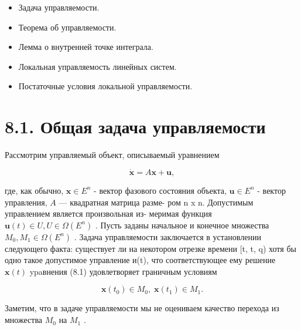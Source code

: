 \documentclass[8pt]{extarticle}
\begin{document}
\begin{itemize}\relax
\item\relax Задача управляемости.
\end{itemize}

\begin{itemize}\relax
\item\relax Теорема об управляемости.
\end{itemize}

\begin{itemize}\relax
\item\relax Лемма о внутренней точке интеграла.
\end{itemize}

\begin{itemize}\relax
\item\relax Локальная управляемость линейных систем.
\end{itemize}

\begin{itemize}\relax
\item\relax Постаточные условия локальной управляемости.
\end{itemize}

\section*{8.1. Общая задача управляемости}

Рассмотрим управляемый объект, описываемый уравнением

\[
\dot{\mathbf{x}} = A\mathbf{x} + \mathbf{u}, \tag{8.1}
\]

где, как обычно, \(\mathbf{x} \in  {E}^{n}\) - вектор фазового состояния объекта, \(\mathbf{u} \in  {E}^{n}\) - вектор управления, \(A\) — квадратная матрица разме- ром n x n. Допустимым управлением является произвольная из- меримая функция \(\mathbf{u}\left( t\right)  \in  U,U \in  \Omega \left( {E}^{n}\right)\) . Пусть заданы начальное и конечное множества \({M}_{0},{M}_{1} \in  \Omega \left( {E}^{n}\right)\) . Задача управляемости заключается в установлении следующего факта: существует ли на некотором отрезке времени [t, t, q) хотя бы одно такое допустимое управление и(t), что соответствующее ему решение \(\mathbf{x}\left( t\right)\) ypaвнения (8.1) удовлетворяет граничным условиям

\[
\mathbf{x}\left( {t}_{0}\right)  \in  {M}_{0},\;\mathbf{x}\left( {t}_{1}\right)  \in  {M}_{1}. \tag{8.2}
\]

Заметим, что в задаче управляемости мы не оцениваем качество перехода из множества \({M}_{0}\) на \({M}_{1}\) .
\end{document}
